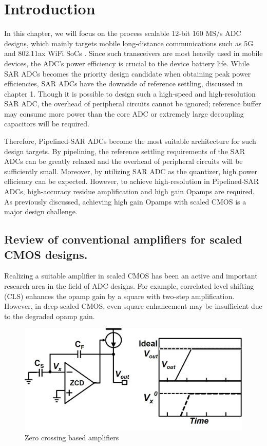
\section{Introduction}

In this chapter, we will focus on the process scalable 12-bit 160 MS/s ADC designs, which mainly targets mobile long-distance communications such as 5G and 802.11ax WiFi SoCs \cite{kawai-11ax}.
Since such transceivers are most heavily used in mobile devices, the ADC's power efficiency is crucial to the device battery life.
While SAR ADCs becomes the priority design candidate when obtaining peak power efficiencies, SAR ADCs have the downside of reference settling, discussed in chapter 1.
Though it is possible to design such a high-speed and high-resolution SAR ADC, the overhead of peripheral circuits cannot be ignored; reference buffer may consume more power than the core ADC \cite{ccliu201612} or extremely large decoupling capacitors will be required.

Therefore, Pipelined-SAR ADCs become the most suitable architecture for such design targets.
By pipelining, the reference settling requirements of the SAR ADCs can be greatly relaxed and the overhead of peripheral circuits will be sufficiently small.
Moreover, by utilizing SAR ADC as the quantizer, high power efficiency can be expected.
However, to achieve high-resolution in Pipelined-SAR ADCs, high-accuracy residue amplification and high gain Opamps are required. 
As previously discussed, achieving high gain Opamps with scaled CMOS is a major design challenge.

\subsection{Review of conventional amplifiers for scaled CMOS designs.}

Realizing a suitable amplifier in scaled CMOS has been an active and important research area in the field of ADC designs.
For example, correlated level shifting (CLS) \cite{gregoire2008over} enhances the opamp gain by a square with two-step amplification. However, in deep-scaled CMOS, even square enhancement may be insufficient due to the degraded opamp gain. 

\begin{figure}[!]
\centering
  \includegraphics[width=1\textwidth]{figure/chap2/zcd.jpg}
  \caption{Zero crossing based amplifiers}
  \label{zcd}
\end{figure}

